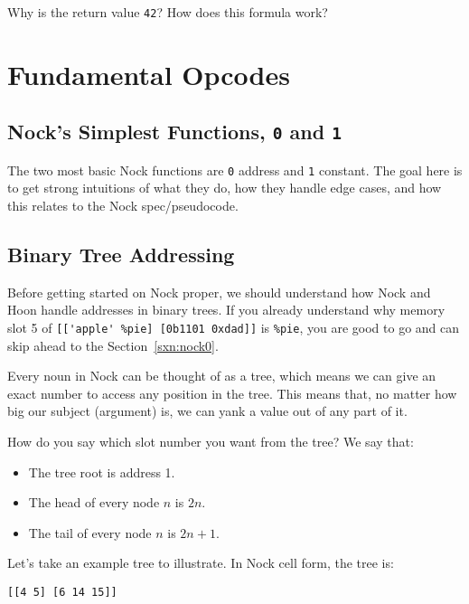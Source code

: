 \documentclass[twoside]{article}
\begin{document}
Why is the return value \lstinline[style=inlinecode]{42}? How does this formula work?

\section{Fundamental Opcodes}

\subsection{Nock's Simplest Functions, \lstinline[style=inlinecode]{0} and \lstinline[style=inlinecode]{1}}

The two most basic Nock functions are \lstinline[style=inlinecode]{0} address and \lstinline[style=inlinecode]{1} constant. The goal here is to get strong intuitions of what they do, how they handle edge cases, and how this relates to the Nock spec/pseudocode.

\subsection{Binary Tree Addressing}

Before getting started on Nock proper, we should understand how Nock and Hoon handle addresses in binary trees.  If you already understand why memory slot 5 of \lstinline[style=inlinecode]{[['apple' %pie] [0b1101 0xdad]]} is \lstinline[style=inlinecode]{%pie}, you are good to go and can skip ahead to the Section~\ref{sxn:nock0}.

Every noun in Nock can be thought of as a tree, which means we can give an exact number to access any position in the tree. This means that, no matter how big our subject (argument) is, we can yank a value out of any part of it.

How do you say which slot number you want from the tree?  We say that:

\begin{itemize}
  \item The tree root is address 1.
  \item The head of every node $n$ is $2n$.
  \item The tail of every node $n$ is $2n+1$.
\end{itemize}

Let's take an example tree to illustrate. In Nock cell form, the tree is:

\begin{lstlisting}[style=listingcode]
[[4 5] [6 14 15]]
\end{lstlisting}
\end{document}
